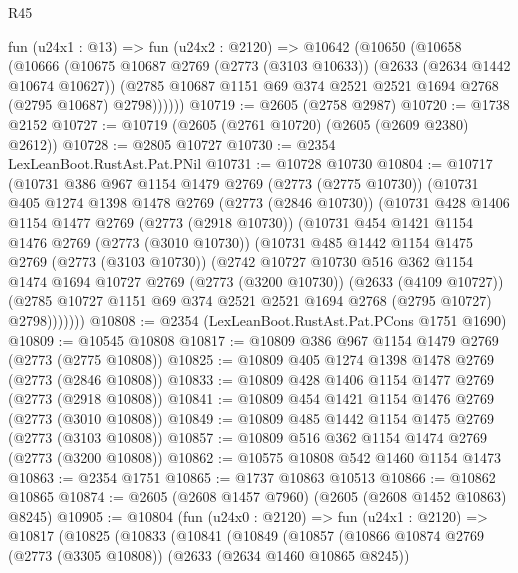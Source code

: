 \begin{lexlean}{R45}
\begin{coremodule}
    fun (u24x1 : @13) =>
    fun (u24x2 : @2120) =>
    @10642
      (@10650
        (@10658
          (@10666
            (@10675
              @10687
              @2769
              (@2773 (@3103 @10633))
              (@2633 (@2634 @1442 @10674 @10627))
              (@2785 @10687 @1151 @69 @374 @2521 @2521 @1694 @2768 (@2795 @10687) @2798))))))
@10719 := @2605 (@2758 @2987)
@10720 := @1738 @2152
@10727 := @10719 (@2605 (@2761 @10720) (@2605 (@2609 @2380) @2612))
@10728 := @2805 @10727
@10730 := @2354 LexLeanBoot.RustAst.Pat.PNil
@10731 := @10728 @10730
@10804 := @10717
    (@10731
      @386
      @967
      @1154
      @1479
      @2769
      (@2773 (@2775 @10730))
      (@10731
        @405
        @1274
        @1398
        @1478
        @2769
        (@2773 (@2846 @10730))
        (@10731
          @428
          @1406
          @1154
          @1477
          @2769
          (@2773 (@2918 @10730))
          (@10731
            @454
            @1421
            @1154
            @1476
            @2769
            (@2773 (@3010 @10730))
            (@10731
              @485
              @1442
              @1154
              @1475
              @2769
              (@2773 (@3103 @10730))
              (@2742
                @10727
                @10730
                @516
                @362
                @1154
                @1474
                @1694
                @10727
                @2769
                (@2773 (@3200 @10730))
                (@2633 (@4109 @10727))
                (@2785 @10727 @1151 @69 @374 @2521 @2521 @1694 @2768 (@2795 @10727) @2798)))))))
@10808 := @2354 (LexLeanBoot.RustAst.Pat.PCons @1751 @1690)
@10809 := @10545 @10808
@10817 := @10809 @386 @967 @1154 @1479 @2769 (@2773 (@2775 @10808))
@10825 := @10809 @405 @1274 @1398 @1478 @2769 (@2773 (@2846 @10808))
@10833 := @10809 @428 @1406 @1154 @1477 @2769 (@2773 (@2918 @10808))
@10841 := @10809 @454 @1421 @1154 @1476 @2769 (@2773 (@3010 @10808))
@10849 := @10809 @485 @1442 @1154 @1475 @2769 (@2773 (@3103 @10808))
@10857 := @10809 @516 @362 @1154 @1474 @2769 (@2773 (@3200 @10808))
@10862 := @10575 @10808 @542 @1460 @1154 @1473
@10863 := @2354 @1751
@10865 := @1737 @10863 @10513
@10866 := @10862 @10865
@10874 := @2605 (@2608 @1457 @7960) (@2605 (@2608 @1452 @10863) @8245)
@10905 := @10804
    (fun (u24x0 : @2120) =>
    fun (u24x1 : @2120) =>
    @10817
      (@10825
        (@10833
          (@10841
            (@10849
              (@10857
                (@10866
                  @10874
                  @2769
                  (@2773 (@3305 @10808))
                  (@2633 (@2634 @1460 @10865 @8245))

\end{coremodule}
\end{lexlean}
